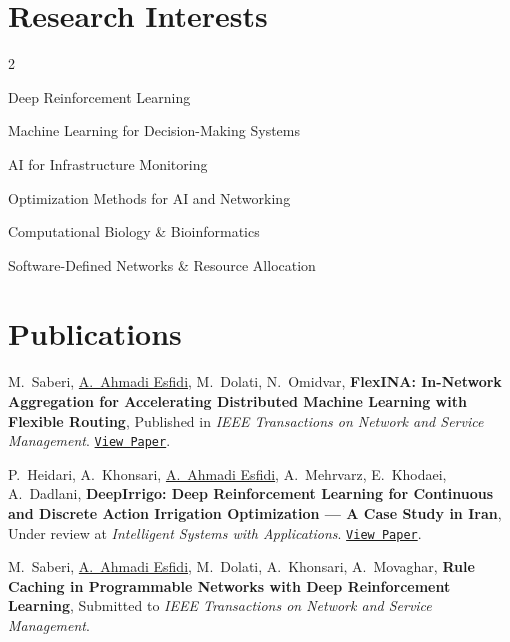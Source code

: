 \documentclass[10pt,a4paper]{article}
\makeatletter
\newlength{\entryskip}    \setlength{\entryskip}{3pt}   %
\newcommand{\entrygap}{\vspace{\entryskip}}
\newcommand{\cvpubgroup}[2]{%
    \noindent{\small\color{accent}#1\hspace{0.5em}\bfseries #2}%
    \par\nobreak\vspace{-1pt}%
}
\newcommand{\tdot}{{\color{dotcol}\,\textbullet\,\allowbreak}}
\newcommand{\cvbullet}{\item[\color{accent}\tiny\faCircle]}
\newcommand{\cvhead}[3]{%
    \begin{tabularx}{\linewidth}{@{}Xr@{}}
        \textbf{\color{darkgray}#1}%
        \textcolor{rulecol}{\small\;|\;}%
        \textcolor{medgray}{\small #2} &
        {\small\color{lightgray}#3}
    \end{tabularx}%
}
\makeatother
\begin{document}


\section{Research Interests}

\setlength{\multicolsep}{0pt}
\begin{multicols}{2}
\begin{cvitems}
    \cvbullet {\color{medgray} Deep Reinforcement Learning}
    \cvbullet {\color{medgray} Machine Learning for Decision-Making Systems}
    \cvbullet {\color{medgray} AI for Infrastructure Monitoring}
    \cvbullet {\color{medgray} Optimization Methods for AI and Networking}
    \cvbullet {\color{medgray} Computational Biology \& Bioinformatics}
    \cvbullet {\color{medgray} Software-Defined Networks \& Resource Allocation}
\end{cvitems}
\end{multicols}

\section{Publications}

\cvpubgroup{\faBookOpen}{Journal Articles}
\begin{cvitems}[itemsep=3pt]
    \cvbullet {\color{medgray}
        M.\ Saberi, \underline{A.\ Ahmadi Esfidi}, M.\ Dolati, N.\ Omidvar,
        \textbf{FlexINA: In-Network Aggregation for Accelerating Distributed Machine Learning with Flexible Routing},
        Published in \textit{IEEE Transactions on Network and Service Management}.
        \href{https://doi.org/10.1109/TNSM.2026.3740503}{\texttt{View Paper}}.}
    \cvbullet {\color{medgray}
        P.\ Heidari, A.\ Khonsari, \underline{A.\ Ahmadi Esfidi}, A.\ Mehrvarz, E.\ Khodaei, A.\ Dadlani,
        \textbf{DeepIrrigo: Deep Reinforcement Learning for Continuous and Discrete Action Irrigation Optimization --- A Case Study in Iran},
        Under review at \textit{Intelligent Systems with Applications}. \href{https://doi.org/10.2139/ssrn.6959427}{\texttt{View Paper}}.}
    \cvbullet {\color{medgray}
        M.\ Saberi, \underline{A.\ Ahmadi Esfidi}, M.\ Dolati, A.\ Khonsari, A.\ Movaghar,
        \textbf{Rule Caching in Programmable Networks with Deep Reinforcement Learning},
        Submitted to \textit{IEEE Transactions on Network and Service Management}.}
\end{cvitems}
\end{document}
